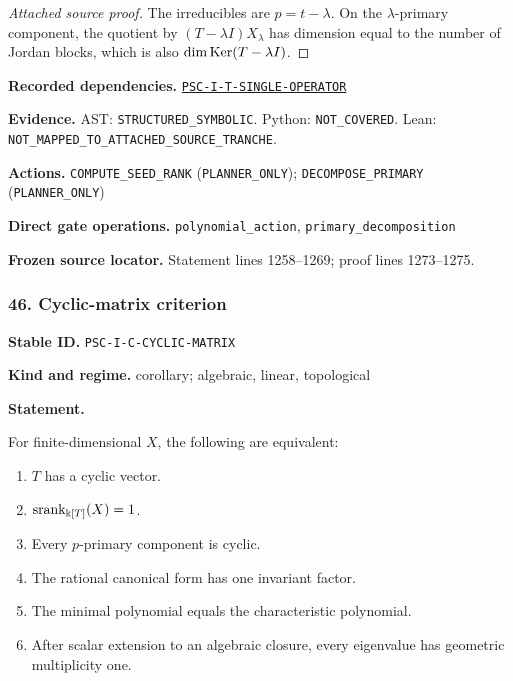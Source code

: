 \documentclass[a4paper,11pt]{article}
\newcommand{\bbk}{\Bbbk}\newcommand{\A}{\mathcal A}\newcommand{\B}{\mathcal B}\newcommand{\Ccal}{\mathcal C}\newcommand{\Pcal}{\mathcal P}\newcommand{\Qcal}{\mathcal Q}\newcommand{\Rcal}{\mathcal R}\newcommand{\Scal}{\mathcal S}
\newcommand{\field}[2]{\noindent\textbf{#1.} #2\par}
\begin{document}
\begin{proof}[Attached source proof]
The irreducibles are $p=t-\lambda$.  On the $\lambda$-primary component, the quotient by $(T-\lambda I)X_\lambda$ has dimension equal to the number of Jordan blocks, which is also $\dim\operatorname{Ker}(T-\lambda I)$.
\end{proof}
\field{Recorded dependencies}{\hyperref[rec:PSC-I-T-SINGLE-OPERATOR]{\nolinkurl{PSC-I-T-SINGLE-OPERATOR}}}
\field{Evidence}{AST: \nolinkurl{STRUCTURED_SYMBOLIC}. Python: \nolinkurl{NOT_COVERED}. Lean: \nolinkurl{NOT_MAPPED_TO_ATTACHED_SOURCE_TRANCHE}.}
\field{Actions}{\nolinkurl{COMPUTE_SEED_RANK} (\nolinkurl{PLANNER_ONLY}); \nolinkurl{DECOMPOSE_PRIMARY} (\nolinkurl{PLANNER_ONLY})}
\field{Direct gate operations}{\nolinkurl{polynomial_action}, \nolinkurl{primary_decomposition}}
\field{Frozen source locator}{Statement lines 1258--1269; proof lines 1273--1275.}
\subsubsection*{46. Cyclic-matrix criterion}
\label{rec:PSC-I-C-CYCLIC-MATRIX}
\field{Stable ID}{\nolinkurl{PSC-I-C-CYCLIC-MATRIX}}
\field{Kind and regime}{corollary; algebraic, linear, topological}
\textbf{Statement.}\par
For finite-dimensional $X$, the following are equivalent:
\begin{enumerate}[label=(\roman*)]
\item $T$ has a cyclic vector.
\item $\srank_{\bbk[T]}(X)=1$.
\item Every $p$-primary component is cyclic.
\item The rational canonical form has one invariant factor.
\item The minimal polynomial equals the characteristic polynomial.
\item After scalar extension to an algebraic closure, every eigenvalue has geometric multiplicity one.
\end{enumerate}
\end{document}

